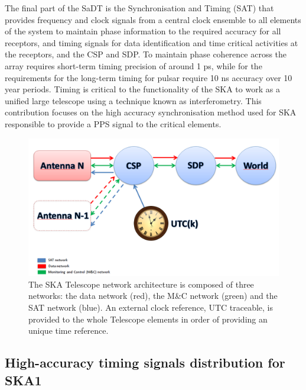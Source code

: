The final part of the SaDT is the Synchronisation and Timing (SAT) that
provides frequency and clock signals from a central clock ensemble to all
elements of the system to maintain phase information to the required accuracy
for all receptors, and timing signals for data identification and time critical
activities at the receptors, and the CSP and SDP. To maintain phase coherence
across the array requires short-term timing precision of around 1 ps, while for
the requirements for the long-term timing for pulsar require 10 ns accuracy
over 10 year periods. Timing is critical to the functionality of the SKA to
work as a unified large telescope using a technique known as interferometry.
This contribution focuses on the high accuracy synchronisation method used for
SKA responsible to provide a PPS signal to the critical elements. 

\begin{figure}[H] \centering \includegraphics[scale=0.4]{img/ska_network_arch}
	\caption{The SKA Telescope network architecture is composed of three
	networks: the data network (red), the M\&C network (green) and the SAT
	network (blue). An external clock reference, UTC traceable, is provided
	to the whole Telescope elements in order of providing an unique time
	reference.} \label{fig:ska_net_arch1} \end{figure}

\subsection{High-accuracy timing signals distribution for SKA1}
\label{subsec:ska-distribution}

